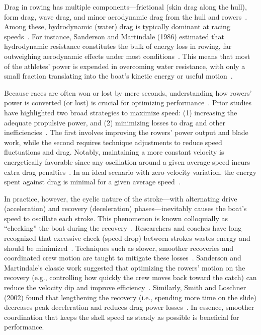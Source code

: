 \documentclass[12pt]{article}
\begin{document}
\newpage

Drag in rowing has multiple components—frictional (skin drag along the hull), form drag, wave drag, and minor aerodynamic drag from the hull and rowers~\cite{pulman2007, baudouinhawkins2002}. Among these, hydrodynamic (water) drag is typically dominant at racing speeds~\cite{baudouinhawkins2002}. For instance, Sanderson and Martindale (1986) estimated that hydrodynamic resistance constitutes the bulk of energy loss in rowing, far outweighing aerodynamic effects under most conditions~\cite{sandersonmartindale1986}. This means that most of the athletes’ power is expended in overcoming water resistance, with only a small fraction translating into the boat’s kinetic energy or useful motion~\cite{rowinginmotion2016}.

Because races are often won or lost by mere seconds, understanding how rowers’ power is converted (or lost) is crucial for optimizing performance~\cite{baudouinhawkins2002, kleshnevnewsletter}. Prior studies have highlighted two broad strategies to maximize speed: (1) increasing the adequate propulsive power, and (2) minimizing losses to drag and other inefficiencies~\cite{sandersonmartindale1986, hofmijster2010}. The first involves improving the rowers’ power output and blade work, while the second requires technique adjustments to reduce speed fluctuations and drag. Notably, maintaining a more constant velocity is energetically favorable since any oscillation around a given average speed incurs extra drag penalties~\cite{rowinginmotion2016, sandersonmartindale1986}. In an ideal scenario with zero velocity variation, the energy spent against drag is minimal for a given average speed~\cite{rowinginmotion2016, sandersonmartindale1986}. 

In practice, however, the cyclic nature of the stroke—with alternating drive (acceleration) and recovery (deceleration) phases—inevitably causes the boat’s speed to oscillate each stroke. This phenomenon is known colloquially as “checking” the boat during the recovery~\cite{rowinginmotion2016, pulman2007}. Researchers and coaches have long recognized that excessive check (speed drop) between strokes wastes energy and should be minimized~\cite{smithloschner2002, hofmijster2010}. Techniques such as slower, smoother recoveries and coordinated crew motion are taught to mitigate these losses~\cite{hofmijster2010, smithloschner2002}. Sanderson and Martindale’s classic work suggested that optimizing the rowers’ motion on the recovery (e.g., controlling how quickly the crew moves back toward the catch) can reduce the velocity dip and improve efficiency~\cite{sandersonmartindale1986, smithloschner2002}. Similarly, Smith and Loschner (2002) found that lengthening the recovery (i.e., spending more time on the slide) decreases peak deceleration and reduces drag power losses~\cite{smithloschner2002}. In essence, smoother coordination that keeps the shell speed as steady as possible is beneficial for performance.
\end{document}
